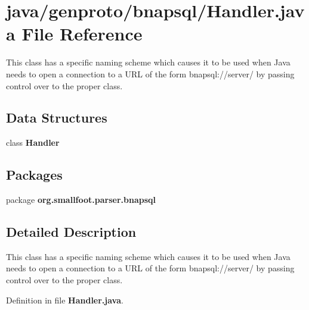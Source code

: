 \section{java/genproto/bnapsql/\+Handler.java File Reference}
\label{bnapsql_2Handler_8java}


This class has a specific naming scheme which causes it to be used when Java needs to open a connection to a U\+R\+L of the form bnapsql\+://server/ by passing control over to the proper class.  


\subsection*{Data Structures}
\begin{DoxyCompactItemize}
\item 
class {\bf Handler}
\end{DoxyCompactItemize}
\subsection*{Packages}
\begin{DoxyCompactItemize}
\item 
package {\bf org.\+smallfoot.\+parser.\+bnapsql}
\end{DoxyCompactItemize}


\subsection{Detailed Description}
This class has a specific naming scheme which causes it to be used when Java needs to open a connection to a U\+R\+L of the form bnapsql\+://server/ by passing control over to the proper class. 



Definition in file {\bf Handler.\+java}.

